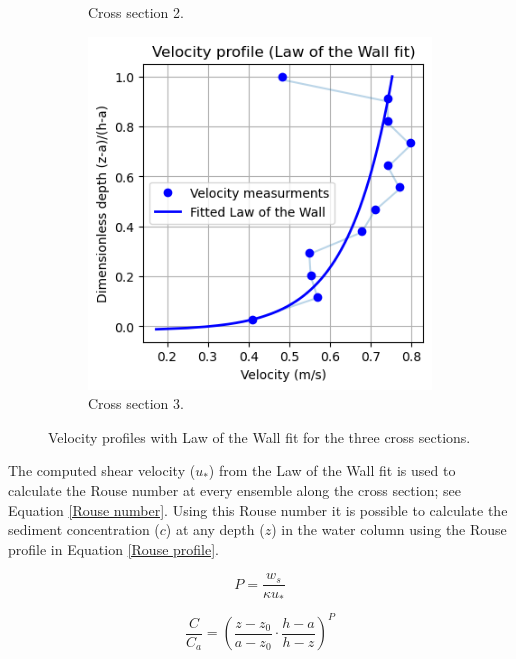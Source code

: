 \begin{figure}[H]
\begin{subfigure}[b]{0.31\linewidth}
        \caption{Cross section 2.}
    \end{subfigure}
    \hfill
    \begin{subfigure}[b]{0.31\linewidth}
        \includegraphics[width=\linewidth]{figures/ch6/cs3_vel_profile.png}
        \caption{Cross section 3.}
    \end{subfigure}
    \caption{Velocity profiles with Law of the Wall fit for the three cross sections.}
    \label{fig: Velocity profiles cross sections}
\end{figure}


The computed shear velocity ($u_*$) from the Law of the Wall fit is used to calculate the Rouse number at every ensemble along the cross section; see Equation \ref{Rouse number}. Using this Rouse number it is possible to calculate the sediment concentration ($c$) at any depth ($z$) in the water column using the Rouse profile in Equation \ref{Rouse profile}.

\begin{equation}
    P = \frac{w_s}{\kappa u_*}
    \label{Rouse number}
\end{equation}

\begin{equation}
    \frac{C}{C_a} = \left( \frac{z - z_0}{a - z_0} \cdot \frac{h - a}{h - z} \right)^{P}
    \label{Rouse profile}
\end{equation}

